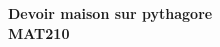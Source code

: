 \documentclass{article}
\begin{document}
\textbf{\Large Devoir maison sur pythagore \\}
\vspace{1cm}
\textbf{\Large MAT210 \\}
\end{document}
